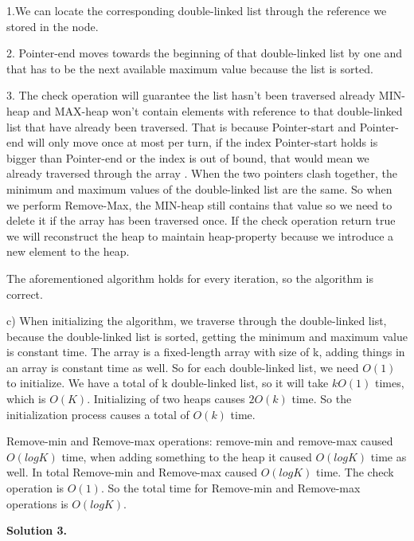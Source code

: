 \documentclass[12pt]{article}
\newcommand{\solution}[1]{\noindent \textbf{Solution #1.}}
\begin{document}
1.We can locate the corresponding double-linked list through the reference we stored in the node.

2. Pointer-end moves towards the beginning of that double-linked list by one and that has to be the next available maximum value because the list is sorted.

3. The check operation will guarantee the list hasn't been traversed already MIN-heap and MAX-heap won't contain elements with reference to that double-linked list that have already been traversed. That is because Pointer-start and Pointer-end will only move once at most per turn, if the index Pointer-start holds is bigger than Pointer-end or the index is out of bound, that would mean we already traversed through the array .  When the two pointers clash together, the minimum and maximum values of the double-linked list are the same. So when we perform Remove-Max, the MIN-heap still contains that value so we need to delete it if the array has been traversed once.  If the check operation return true we will reconstruct the heap to maintain heap-property because we introduce a new element to the heap.


The aforementioned algorithm holds for every iteration, so the algorithm is correct.

c) When initializing the algorithm, we traverse through the double-linked list, because the double-linked list is sorted, getting the minimum and maximum value is constant time. The array is a fixed-length array with size of k, adding things in an array is constant time as well. So for each double-linked list, we need $O(1)$ to initialize. We have a total of k double-linked list, so it will take $kO(1)$ times, which is $O(K)$. Initializing of two heaps causes $2O(k)$ time. So the initialization process causes a total of $O(k)$ time.

Remove-min and Remove-max operations: remove-min and remove-max caused $O(logK)$ time, when adding something to the heap it caused $O(logK)$ time as well. In total Remove-min and Remove-max caused $O(logK)$ time. 
The check operation is $O(1)$. So the total time for Remove-min and Remove-max operations is $O(logK)$.




\solution{3} 
\end{document}
